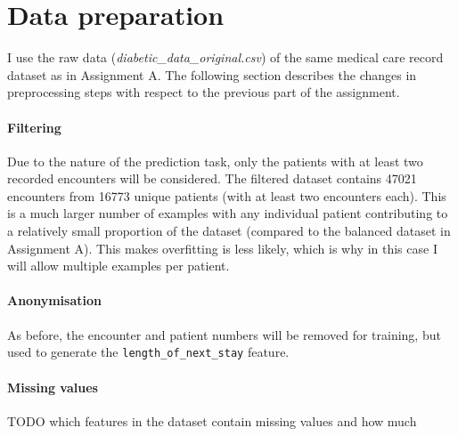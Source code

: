 \documentclass[10pt, twocolumn]{article}
\begin{document}
\thispagestyle{first}
\pagestyle{plain}


\section{Data preparation}

I use the raw data (\textit{diabetic\_data\_original.csv}) of the same medical care record dataset \cite{strack2014dataset} as in Assignment A. The following section describes the changes in preprocessing steps with respect to the previous part of the assignment.

\paragraph{Filtering}
Due to the nature of the prediction task, only the patients with at least two recorded encounters will be considered. The filtered dataset contains 47021 encounters from 16773 unique patients (with at least two encounters each). This is a much larger number of examples with any individual patient contributing to a relatively small proportion of the dataset (compared to the balanced dataset in Assignment A). This makes overfitting is less likely, which is why in this case I will allow multiple examples per patient. 

\paragraph{Anonymisation} As before, the encounter and patient numbers will be removed for training, but used to generate the \texttt{length\_of\_next\_stay} feature.

\paragraph{Missing values} 

TODO which features in the dataset contain missing values and how much 
\end{document}

